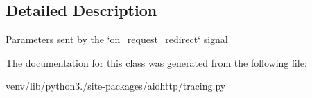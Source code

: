 \subsection{Detailed Description}
\begin{DoxyVerb}Parameters sent by the `on_request_redirect` signal\end{DoxyVerb}
 

The documentation for this class was generated from the following file\+:\begin{DoxyCompactItemize}
\item 
venv/lib/python3./site-\/packages/aiohttp/tracing.\+py\end{DoxyCompactItemize}
